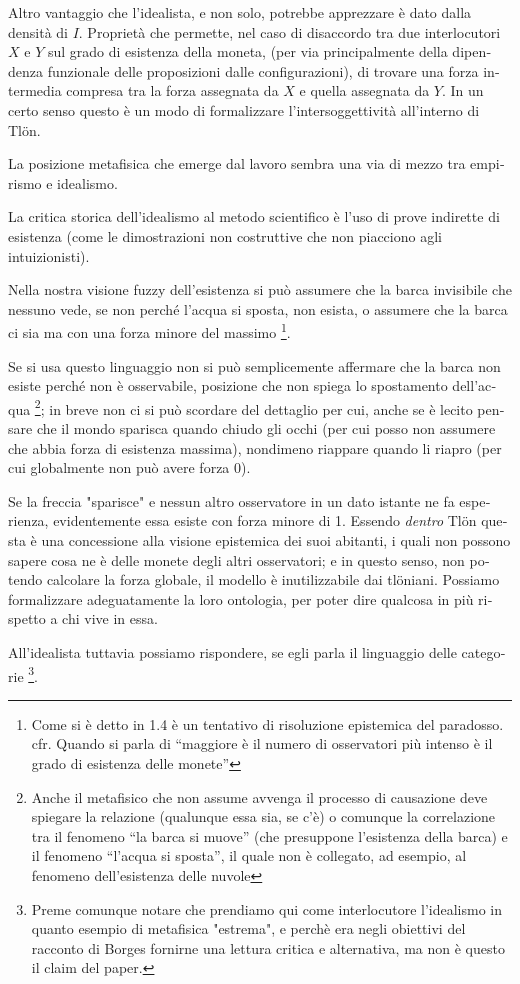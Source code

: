 \begin{italian}
	Altro vantaggio che l'idealista, e non solo, potrebbe apprezzare è dato dalla densità di $I$. Proprietà che permette, nel caso di disaccordo tra due interlocutori $X$ e $Y$ sul grado di esistenza della moneta, (per via principalmente della dipendenza funzionale delle proposizioni dalle configurazioni), di trovare una forza intermedia compresa tra la forza assegnata da $X$ e quella assegnata da $Y$. In un certo senso questo è un modo di formalizzare l'intersoggettività all'interno di Tl\"on.



	La posizione metafisica che emerge dal lavoro sembra una via di mezzo tra empirismo e idealismo.

	La critica storica dell'idealismo al metodo scientifico è l'uso di prove indirette di esistenza (come le dimostrazioni non costruttive che non piacciono agli intuizionisti).

	Nella nostra visione fuzzy dell'esistenza si può assumere che la barca invisibile che nessuno vede, se non perché l'acqua si sposta, non esista, o assumere che la barca ci sia ma con una forza minore del massimo \footnote{Come si è detto in 1.4 è un tentativo di risoluzione epistemica del paradosso. cfr. Quando si parla di ``maggiore è il numero di osservatori più intenso è il grado di esistenza delle monete''}.

	Se si usa questo linguaggio non si può semplicemente affermare che la barca non esiste perché non è osservabile, posizione che non spiega lo spostamento dell'acqua \footnote{Anche il metafisico che non assume avvenga il processo di causazione deve spiegare la relazione (qualunque essa sia, se c'è) o comunque la correlazione tra il fenomeno ``la barca si muove'' (che presuppone l'esistenza della barca) e il fenomeno ``l'acqua si sposta'', il quale non è collegato, ad esempio, al fenomeno dell'esistenza delle nuvole}; in breve non ci si può scordare del dettaglio per cui, anche se è lecito pensare che il mondo sparisca quando chiudo gli occhi (per cui posso non assumere che abbia forza di esistenza massima), nondimeno riappare quando li riapro (per cui globalmente non può avere forza 0).

	Se la freccia "sparisce" e nessun altro osservatore in un dato istante ne fa esperienza, evidentemente essa esiste con forza minore di 1. Essendo \emph{dentro} Tl\"on questa è una concessione alla visione epistemica dei suoi abitanti, i quali non possono sapere cosa ne è delle monete degli altri osservatori; e in questo senso, non potendo calcolare la forza globale, il modello è inutilizzabile dai tl\"oniani. Possiamo formalizzare adeguatamente la loro ontologia, per poter dire qualcosa in più rispetto a chi vive in essa.

	All'idealista tuttavia possiamo rispondere, se egli parla il linguaggio delle categorie \footnote{Preme comunque notare che prendiamo qui come interlocutore l'idealismo in quanto esempio di metafisica "estrema", e perchè era negli obiettivi del racconto di Borges fornirne una lettura critica e alternativa, ma non è questo il claim del paper. }.

\end{italian}

